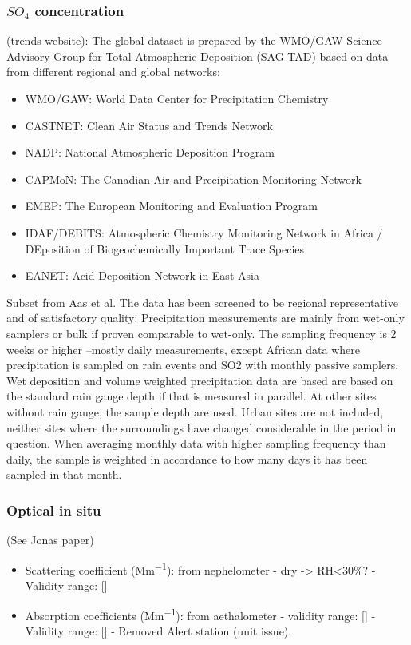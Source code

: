 \documentclass[journal abbreviation, manuscript]{copernicus}
\begin{document}
\subsubsection{$SO_{4}$ concentration}
(trends website): The global dataset is prepared by the WMO/GAW Science Advisory Group for Total Atmospheric Deposition (SAG-TAD) based on data from different regional and global networks:
\begin{itemize}
 \item WMO/GAW: World Data Center for Precipitation Chemistry
 \item CASTNET: Clean Air Status and Trends Network
 \item NADP: National Atmospheric Deposition Program
 \item CAPMoN: The Canadian Air and Precipitation Monitoring Network
 \item EMEP: The European Monitoring and Evaluation Program
 \item IDAF/DEBITS: Atmospheric Chemistry Monitoring Network in Africa / DEposition of Biogeochemically Important Trace Species
 \item EANET: Acid Deposition Network in East Asia
\end{itemize}

Subset from Aas et al.
The data has been screened to be regional representative and of satisfactory quality:
Precipitation measurements are mainly from wet-only samplers or bulk if proven comparable to wet-only.
The sampling frequency is 2 weeks or higher –mostly daily measurements, except African data where precipitation is sampled on rain events and SO2 with monthly passive samplers.
Wet deposition and volume weighted precipitation data are based are based on the standard rain gauge depth if that is measured in parallel. At other sites without rain gauge, the sample depth are used.
Urban sites are not included, neither sites where the surroundings have changed considerable in the period in question.
When averaging monthly data with higher sampling frequency than daily, the sample is weighted in accordance to how many days it has been sampled in that month.

\subsubsection{Optical in situ}
(See Jonas paper)
\begin{itemize}
 \item Scattering coefficient (\unit{Mm^{-1}}): from nephelometer - dry -> RH<30\%? - Validity range: []
 \item Absorption coefficients (\unit{Mm^{-1}}): from aethalometer - validity range: [] - Validity range: [] - Removed Alert station (unit issue).
\end{itemize}
\end{document}
